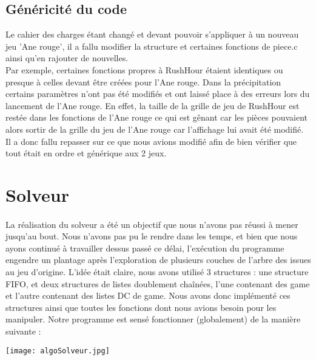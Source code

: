 \documentclass[20pt]{article}
\begin{document}
\subsection{Généricité du code}

Le cahier des charges étant changé et devant pouvoir s'appliquer à un nouveau jeu 'Ane rouge', il a fallu modifier la structure et certaines fonctions de piece.c ainsi qu'en rajouter de nouvelles.\\
Par exemple, certaines fonctions propres à RushHour étaient identiques ou presque à celles devant être créées pour l'Ane rouge. Dans la précipitation certains paramètres n'ont pas été modifiés et ont laissé place à des erreurs lors du lancement de l'Ane rouge. En effet, la taille de la grille de jeu de RushHour est restée dans les fonctions de l'Ane rouge ce qui est gênant car les pièces pouvaient alors sortir de la grille du jeu de l'Ane rouge car l'affichage lui avait été modifié.\\
Il a donc fallu repasser sur ce que nous avions modifié afin de bien vérifier que tout était en ordre et générique aux 2 jeux.


\section{Solveur}
\paragraph{}
La réalisation du solveur a été un objectif que nous n'avons pas réussi à mener jusqu'au bout. Nous n'avons pas pu le rendre dans les temps, et bien que nous ayons continué à travailler dessus passé ce délai, l'exécution du programme engendre un plantage après l'exploration de plusieurs couches de l'arbre des issues au jeu d'origine. L'idée était claire, nous avons utilisé 3 structures : une structure FIFO, et deux structures de listes doublement chaînées, l'une contenant des game et l'autre contenant des listes DC de game. Nous avons donc implémenté ces structures ainsi que toutes les fonctions dont nous avions besoin pour les manipuler.
Notre programme est sensé fonctionner (globalement) de la manière suivante :

\begin{center}
\texttt{[image: algoSolveur.jpg]}
\end{center}
\end{document}
